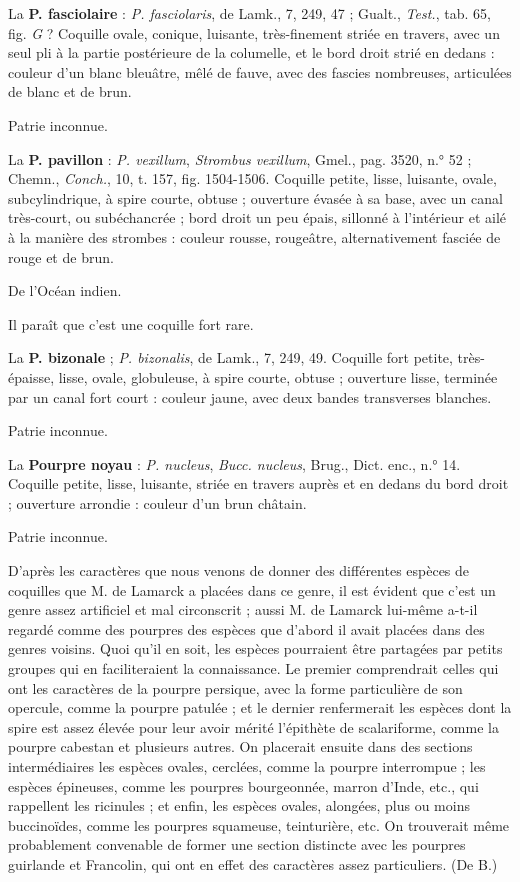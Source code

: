 \documentclass[a4paper, 11pt, oneside, polutonikogreek, french]{article}
\begin{document}
La \textbf{P. fasciolaire} : \emph{P. fasciolaris}, de Lamk., 7, 249, 47 ; Gualt., \emph{Test.}, tab. 65, fig. \emph{G} ? Coquille ovale, conique, luisante, très-finement striée en travers, avec un seul pli à la partie postérieure de la columelle, et le bord droit strié en dedans : couleur d'un blanc bleuâtre, mêlé de fauve, avec des fascies nombreuses, articulées de blanc et de brun.

Patrie inconnue.

\bigskip

La \textbf{P. pavillon} : \emph{P. vexillum}, \emph{Strombus vexillum}, Gmel., pag. 3520, n.° 52 ; Chemn., \emph{Conch.}, 10, t. 157, fig. 1504-1506. Coquille petite, lisse, luisante, ovale, subcylindrique, à spire courte, obtuse ; ouverture évasée à sa base, avec un canal très-court, ou subéchancrée ; bord droit un peu épais, sillonné à l'intérieur et ailé à la manière des strombes : couleur rousse, rougeâtre, alternativement fasciée de rouge et de brun.

De l'Océan indien.

Il paraît que c'est une coquille fort rare.

\bigskip

La \textbf{P. bizonale} ; \emph{P. bizonalis}, de Lamk., 7, 249, 49. Coquille fort petite, très-épaisse, lisse, ovale, globuleuse, à spire courte, obtuse ; ouverture lisse, terminée par un canal fort court : couleur jaune, avec deux bandes transverses blanches.

Patrie inconnue.

\bigskip

La \textbf{Pourpre noyau} : \emph{P. nucleus}, \emph{Bucc. nucleus}, Brug., Dict. enc., n.° 14. Coquille petite, lisse, luisante, striée en travers auprès et en dedans du bord droit ; ouverture arrondie : couleur d'un brun châtain.

Patrie inconnue.

\bigskip

D'après les caractères que nous venons de donner des différentes espèces de coquilles que M. de Lamarck a placées dans ce genre, il est évident que c'est un genre assez artificiel et mal circonscrit ; aussi M. de Lamarck lui-même a-t-il regardé comme des pourpres des espèces que d'abord il avait placées dans des genres voisins. Quoi qu'il en soit, les espèces pourraient être partagées par petits groupes qui en faciliteraient la connaissance. Le premier comprendrait celles qui ont les caractères de la pourpre persique, avec la forme particulière de son opercule, comme la pourpre patulée ; et le dernier renfermerait les espèces dont la spire est assez élevée pour leur avoir mérité l'épithète de scalariforme, comme la pourpre cabestan et plusieurs autres. On placerait ensuite dans des sections intermédiaires les espèces ovales, cerclées, comme la pourpre interrompue ; les espèces épineuses, comme les pourpres bourgeonnée, marron d'Inde, etc., qui rappellent les ricinules ; et enfin, les espèces ovales, alongées, plus ou moins buccinoïdes, comme les pourpres squameuse, teinturière, etc. On trouverait même probablement convenable de former une section distincte avec les pourpres guirlande et Francolin, qui ont en effet des caractères assez particuliers. (De B.)
\end{document}
